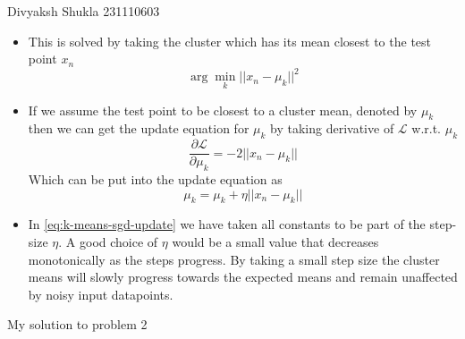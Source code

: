 \documentclass[a4paper,11pt]{article}
\begin{document}
{Divyaksh Shukla}   %
{231110603}	%

\date{November 8, 2023}

\begin{mlsolution}

\begin{itemize}
    \item This is solved by taking the cluster which has its mean closest to the test point $x_n$ $$ \arg\min_{k}||x_n-\mu_k||^{2} $$
    \item If we assume the test point to be closest to a cluster mean, denoted by $\mu_{k}$ then we can get the update equation for $\mu_{k}$ by taking derivative of $\mathcal{L}$ w.r.t. $\mu_{k}$ $$ \frac{\partial \mathcal{L}}{\partial \mu_{k}} = -2||x_{n} - \mu_{k}|| $$ Which can be put into the update equation as \begin{equation}
        \mu_{k} = \mu_{k} + \eta ||x_{n} - \mu_{k}||
        \label{eq:k-means-sgd-update}
    \end{equation}
    \item In \ref{eq:k-means-sgd-update} we have taken all constants to be part of the step-size $\eta$. A good choice of $\eta$ would be a small value that decreases monotonically as the steps progress. By taking a small step size the cluster means will slowly progress towards the expected means and remain unaffected by noisy input datapoints.
\end{itemize}



\end{mlsolution}

\begin{mlsolution} 

My solution to problem 2


\end{mlsolution}
\end{document}
